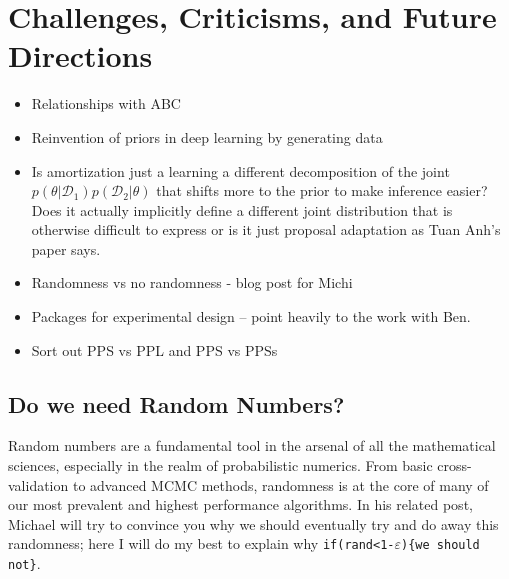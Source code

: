 
\chapter{Challenges, Criticisms, and Future Directions}
\label{chp:discussion}

\begin{itemize}
	\item Relationships with ABC
	\item Reinvention of priors in deep learning by generating data
	\item Is amortization just a learning a different decomposition of the joint 
	$p(\theta | \mathcal{D}_1)p(\mathcal{D}_2|\theta)$ that shifts more to the
	prior to make inference easier?  Does it actually implicitly define a different
	joint distribution that is otherwise difficult to express or is it just proposal
	adaptation as Tuan Anh's paper says.
	\item Randomness vs no randomness - blog post for Michi
	\item Packages for experimental design -- point heavily to the work with Ben.
	\item Sort out PPS vs PPL and PPS vs PPSs
\end{itemize}

\section{Do we need Random Numbers?}
	
Random numbers are a fundamental tool in the arsenal of all the mathematical sciences, especially in the realm of 
probabilistic numerics.  From basic cross-validation to advanced MCMC methods, randomness is at the core of 
many of our most prevalent and highest performance algorithms.  In his related post, Michael will 
try to convince you why we should eventually try and do away this randomness; here I will do my best to explain why
\texttt{if(rand<1-$\varepsilon$)\{we should not\}}.

